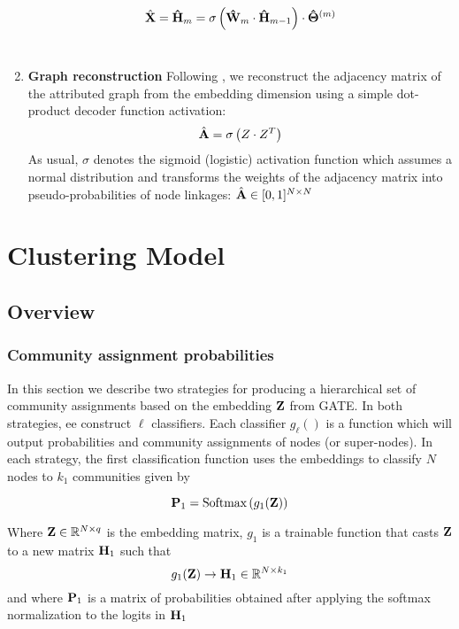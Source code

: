 \documentclass[a4paper,12pt]{article}
\begin{document}
\begin{enumerate}
{				\[\hat{\bf X} = {\bf \hat{H}}_m = \sigma\left({\bf \hat{W}}_{m}\cdot {\bf \hat{H}}_{m-1}\right)\cdot {\bf \hat{\Theta}}^{(m)}\]
			}\\
			
			\item[]{\textbf{Graph reconstruction} 
				Following \cite{kipf2016semi, salehi2019graph, zhou2023community}, we reconstruct the adjacency matrix of the attributed graph from the embedding dimension using a simple dot-product decoder function activation: 
				\[\hat{\bf A} = \sigma\left(Z\cdot Z^T\right) \]
				As usual, $\sigma$ denotes the sigmoid (logistic) activation function which assumes a normal distribution and transforms the weights of the adjacency matrix into pseudo-probabilities of node linkages: $\hat{\bf A} \in [0,1]^{N\times N}$
			}\\
				
		\end{enumerate}
		
		\section{Clustering Model}
		\subsection*{Overview}
			\subsubsection{Community assignment probabilities} 
			
			In this section we describe two strategies for producing a hierarchical set of community assignments based on the embedding $\bf Z$ from GATE. In both strategies, ee construct $\ell$ classifiers. Each classifier $g_\ell()$ is a function which will output probabilities and community assignments of nodes (or super-nodes). In each strategy, the first classification function uses the embeddings to classify $N$ nodes to $k_1$ communities given by
			
			\[{\bf P}_{1} = \text{Softmax}\left(g_1({\bf Z})\right) \]
			
			Where ${\bf Z} \in \mathbb{R}^{N \times q}$ is the embedding matrix, $g_1$ is a trainable function that casts $\bf Z$ to a new matrix ${\bf H}_1$ such that
			\[g_1({\bf Z}) \rightarrow {\bf H}_1 \in \mathbb{R}^{N\times k_1}\]
			and where ${\bf P}_1$ is a matrix of probabilities obtained after applying the softmax normalization to the logits in ${\bf H}_1$
			 
\end{document}
